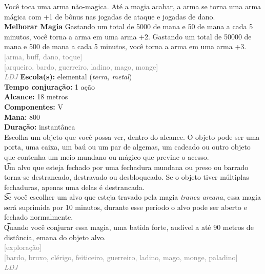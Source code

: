 \documentclass{RPG_Adventure}[2021/10/20]
\begin{document}
{\normalsize Você toca uma arma não-magica. Até a magia acabar, a arma se torna uma arma mágica com +1 de bônus nas jogadas de ataque e jogadas de dano.\\\t \textbf{Melhorar Magia} Gastando um total de 5000 de mana e 50 de mana a cada 5 minutos, você torna a arma em uma arma +2. Gastando um total de 50000 de mana e 500 de mana a cada 5 minutos, você torna a arma em uma arma +3.\\}
{\scriptsize \textcolor{gray}{[arma, buff, dano, toque]\\}}
{\scriptsize \textcolor{gray}{[arqueiro, bardo, guerreiro, ladino, mago, monge]\\}}
{\tiny \textcolor{gray}{\textit{LDJ}}}\jump{}
{\small \t \textbf{Escola(s):} elemental (\textit{terra, metal})\\\t \textbf{Tempo conjuração:} 1 ação\\\t \textbf{Alcance:} 18 metros\\\t \textbf{Componentes:} V\\\t \textbf{Mana:} 800\\\t \textbf{Duração:} instantânea\\}
{\normalsize Escolha um objeto que você possa ver, dentro do alcance. O objeto pode ser uma porta, uma caixa, um baú ou um par de algemas, um cadeado ou outro objeto que contenha um meio mundano ou mágico que previne o acesso.\\\t Um alvo que esteja fechado por uma fechadura mundana ou preso ou barrado torna-se destrancado, destravado ou desbloqueado. Se o objeto tiver múltiplas fechaduras, apenas uma delas é destrancada.\\\t Se você escolher um alvo que esteja travado pela magia \textit{tranca arcana}, essa magia será suprimida por 10 minutos, durante esse período o alvo pode ser aberto e fechado normalmente.\\\t Quando você conjurar essa magia, uma batida forte, audível a até 90 metros de distância, emana do objeto alvo.\\}
{\scriptsize \textcolor{gray}{[exploração]\\}}
{\scriptsize \textcolor{gray}{[bardo, bruxo, clérigo, feiticeiro, guerreiro, ladino, mago, monge, paladino]\\}}
{\tiny \textcolor{gray}{\textit{LDJ}}}\jump{}
\end{document}
